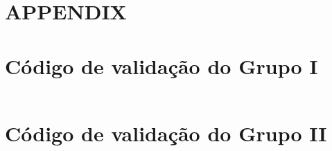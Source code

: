 \appendix

\section*{APPENDIX}

\section{Código de validação do Grupo I}

\inputminted{octave}{e-folio/e-folio-a/codigo/grupo-i.m}

\clearpage

\section{Código de validação do Grupo II}

\inputminted{octave}{e-folio/e-folio-a/codigo/grupo-ii.m}
